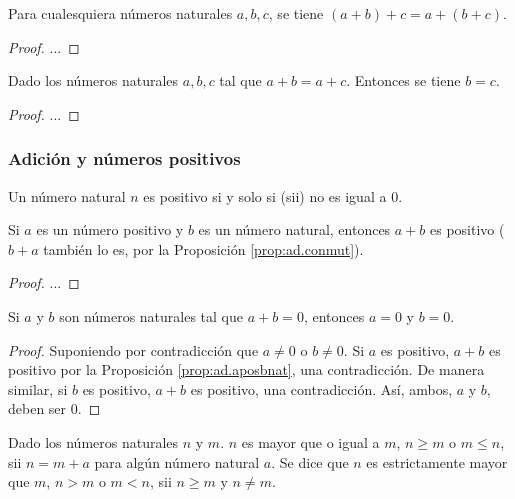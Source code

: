 \begin{proposition}[Asociativa]\label{prop:ad.asoc}
  Para cualesquiera números naturales $a, b, c$, se tiene $(a + b) + c = a + (b+ c)$.
\end{proposition}

\begin{proof}
  ...
\end{proof}

\begin{proposition}
  Dado los números naturales $a, b, c$ tal que $a + b = a + c$. Entonces se tiene $b = c$.
\end{proposition}

\begin{proof}
  ...
\end{proof}




\subsubsection{Adición y números positivos}

\begin{definition}
  Un número natural $n$ es positivo si y solo si (sii) no es igual a $0$.
\end{definition}

\begin{proposition}\label{prop:ad.aposbnat}
  Si $a$ es un número positivo y $b$ es un número natural, entonces $a + b$ es positivo ($b + a$ también lo es, por la Proposición \ref{prop:ad.conmut}).
\end{proposition}

\begin{proof}
  ...
\end{proof}

\begin{corollary}
  Si $a$ y $b$ son números naturales tal que $a + b = 0$, entonces $a = 0$ y $b = 0$.
\end{corollary}

\begin{proof}
  Suponiendo por contradicción que $a \neq 0$ o $b \neq 0$. Si $a$ es positivo, $a + b$ es positivo por la Proposición \ref{prop:ad.aposbnat}, una contradicción. De manera similar, si $b$ es positivo, $a + b$ es positivo, una contradicción. Así, ambos, $a$ y $b$, deben ser $0$.
\end{proof}

\begin{definition}
  Dado los números naturales $n$ y $m$. $n$ es mayor que o igual a $m$, $n \geq m$ o $m \leq n$, sii $n = m + a$ para algún número natural $a$. Se dice que $n$ es estrictamente mayor que $m$, $n > m$ o $m < n$, sii $n \geq m$ y $n \neq m$.
\end{definition}

